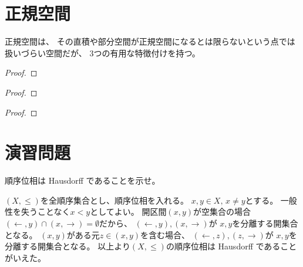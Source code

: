 \documentclass[report]{jlreq}
\begin{document}
%
\section{正規空間}

正規空間は、
その直積や部分空間が正規空間になるとは限らないという点では扱いづらい空間だが、
3つの有用な特徴付けを持つ。

\begin{definition}[正規空間]
    \TODO{}
\end{definition}

\begin{theorem}
    \TODO{}
\end{theorem}

\begin{proof}
    \TODO{}
\end{proof}

\begin{theorem}
    \TODO{}
\end{theorem}

\begin{proof}
    \TODO{}
\end{proof}

\begin{theorem}[開被覆の縮小可能性]
    \TODO{}
\end{theorem}

\begin{proof}
    \TODO{}
\end{proof}

%
\section{演習問題}

\begin{problem}
    順序位相は Hausdorff であることを示せ。
\end{problem}

\begin{answer}
    $(X, \le)$を全順序集合とし、順序位相を入れる。
    $x, y \in X, \, x \neq y$とする。
    一般性を失うことなく$x < y$としてよい。
    開区間$(x, y)$が空集合の場合
    $(\leftarrow, y) \cap (x, \rightarrow) = \emptyset$だから、
    $(\leftarrow, y), (x, \rightarrow)$が
    $x, y$を分離する開集合となる。
    $(x, y)$がある元$z \in (x, y)$を含む場合、
    $(\leftarrow, z), (z, \rightarrow)$が
    $x, y$を分離する開集合となる。
    以上より$(X, \le)$の順序位相は Hausdorff であることがいえた。
\end{answer}
\end{document}
